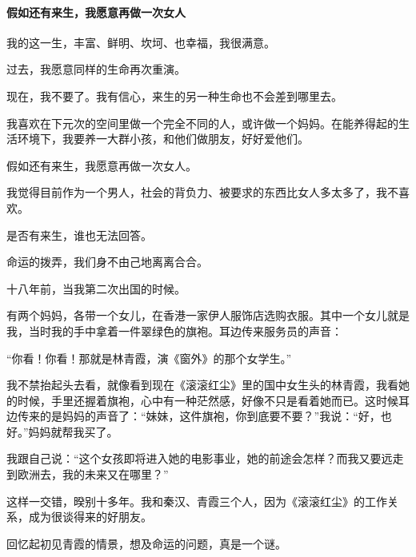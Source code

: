 \paragraph*{假如还有来生，我愿意再做一次女人}
\par 我的这一生，丰富、鲜明、坎坷、也幸福，我很满意。
\par 过去，我愿意同样的生命再次重演。
\par 现在，我不要了。我有信心，来生的另一种生命也不会差到哪里去。
\par 我喜欢在下元次的空间里做一个完全不同的人，或许做一个妈妈。在能养得起的生活环境下，我要养一大群小孩，和他们做朋友，好好爱他们。
\par 假如还有来生，我愿意再做一次女人。
\par 我觉得目前作为一个男人，社会的背负力、被要求的东西比女人多太多了，我不喜欢。
\par 是否有来生，谁也无法回答。
\par 命运的拨弄，我们身不由己地离离合合。
\par 十八年前，当我第二次出国的时候。
\par 有两个妈妈，各带一个女儿，在香港一家伊人服饰店选购衣服。其中一个女儿就是我，当时我的手中拿着一件翠绿色的旗袍。耳边传来服务员的声音：
\par “你看！你看！那就是林青霞，演《窗外》的那个女学生。”
\par 我不禁抬起头去看，就像看到现在《滚滚红尘》里的国中女生头的林青霞，我看她的时候，手里还握着旗袍，心中有一种茫然感，好像不只是看着她而已。这时候耳边传来的是妈妈的声音了：“妹妹，这件旗袍，你到底要不要？”我说：“好，也好。”妈妈就帮我买了。
\par 我跟自己说：“这个女孩即将进入她的电影事业，她的前途会怎样？而我又要远走到欧洲去，我的未来又在哪里？”
\par 这样一交错，暌别十多年。我和秦汉、青霞三个人，因为《滚滚红尘》的工作关系，成为很谈得来的好朋友。
\par 回忆起初见青霞的情景，想及命运的问题，真是一个谜。
\par {}






